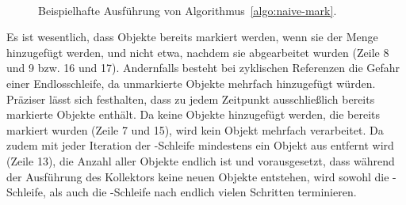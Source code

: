 \begin{figure}[H] \newcommand{\markexscale}{0.85} \newcommand{\markexspace}{0.7cm}
	\centering
	\begin{subfigure}[t]{0.45\textwidth}
		\centering
		
	\end{subfigure}~\hspace{\markexspace}~
	\begin{subfigure}[t]{0.45\textwidth}
		\centering
		
	\end{subfigure}\\[1cm]
	\begin{subfigure}[t]{0.45\textwidth}
		\centering
		
	\end{subfigure}~\hspace{\markexspace}~
	\begin{subfigure}[t]{0.45\textwidth}
		\centering
		
	\end{subfigure}\\[1cm]
	\begin{subfigure}[t]{0.45\textwidth}
		\centering
		
	\end{subfigure}~\hspace{\markexspace}~
	\begin{subfigure}[t]{0.45\textwidth}
		\centering
		
	\end{subfigure}\\[0.5cm]
	\caption[Beispielhafte Ausführung der Markierungsphase]{Beispielhafte Ausführung von Algorithmus~\ref{algo:naive-mark}.}
	\label{fig:mark-example}
\end{figure}

Es ist wesentlich, dass Objekte bereits markiert werden, wenn sie der Menge  hinzugefügt werden, und nicht etwa, nachdem sie abgearbeitet wurden (Zeile 8 und 9 bzw. 16 und 17).
Andernfalls besteht bei zyklischen Referenzen die Gefahr einer Endlosschleife, da unmarkierte Objekte mehrfach hinzugefügt würden.
Präziser lässt sich festhalten, dass  zu jedem Zeitpunkt ausschließlich bereits markierte Objekte enthält.
Da keine Objekte hinzugefügt werden, die bereits markiert wurden (Zeile 7 und 15), wird kein Objekt mehrfach verarbeitet.
Da zudem mit jeder Iteration der \WHILE-Schleife mindestens ein Objekt aus  entfernt wird (Zeile 13), die Anzahl aller Objekte endlich ist und vorausgesetzt, dass während der Ausführung des Kollektors keine neuen Objekte entstehen, wird sowohl die \WHILE-Schleife, als auch die \FOREACH-Schleife nach endlich vielen Schritten terminieren.

